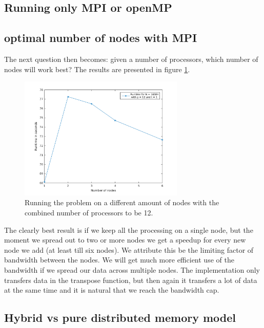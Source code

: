 
\subsection*{Running only MPI or openMP}



\subsection*{optimal number of nodes with MPI}

The next question then becomes: given a number of processors, which number of nodes will work best? The results are presented in figure \ref{fig:bestnodes}.
\begin{figure}[h]
\centering
\includegraphics[width=0.7\textwidth]{./figures/bestnodes}
\caption{Running the problem on a different amount of nodes with the combined number of processors to be 12.}
\label{fig:bestnodes}
\end{figure}
The clearly best result is if we keep all the processing on a single node, but the moment we spread out to two or more nodes we get a speedup for every new node we add (at least till six nodes). We attribute this be the limiting factor of bandwidth between the nodes. We will get much more efficient use of the bandwidth if we spread our data across multiple nodes. The implementation only transfers data in the transpose function, but then again it transfers a lot of data at the same time and it is natural that we reach the bandwidth cap.

\subsection*{Hybrid vs pure distributed memory model}

